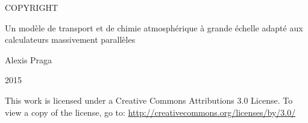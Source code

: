 \begin{center}
\Large COPYRIGHT

\vspace*{1cm}
{\Large Un mod\`ele de transport et de chimie atmosph\'erique \`a grande \'echelle
adapt\'e aux calculateurs massivement parall\`eles}

\vspace*{1cm}
Alexis Praga

2015
\end{center}

\vspace*{1cm}
This work is licensed under a Creative Commons Attributions 3.0 License.
To view a copy of the license, go to:
\url{http://creativecommons.org/licenses/by/3.0/}

